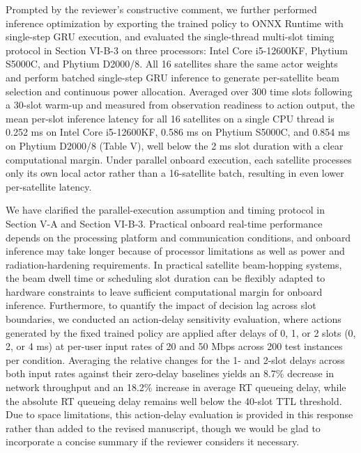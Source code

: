 \documentclass[11pt,a4paper]{article}
\begin{document}
Prompted by the reviewer's constructive comment, we further performed inference optimization by exporting the trained policy to ONNX Runtime with single-step GRU execution, and evaluated the single-thread multi-slot timing protocol in Section VI-B-3 on three processors: Intel Core i5-12600KF, Phytium S5000C, and Phytium D2000/8. All 16 satellites share the same actor weights and perform batched single-step GRU inference to generate per-satellite beam selection and continuous power allocation. Averaged over 300 time slots following a 30-slot warm-up and measured from observation readiness to action output, the mean per-slot inference latency for all 16 satellites on a single CPU thread is 0.252 ms on Intel Core i5-12600KF, 0.586 ms on Phytium S5000C, and 0.854 ms on Phytium D2000/8 (Table V), well below the 2 ms slot duration with a clear computational margin. Under parallel onboard execution, each satellite processes only its own local actor rather than a 16-satellite batch, resulting in even lower per-satellite latency.
\par

We have clarified the parallel-execution assumption and timing protocol in Section V-A and Section VI-B-3. Practical onboard real-time performance depends on the processing platform and communication conditions, and onboard inference may take longer because of processor limitations as well as power and radiation-hardening requirements. In practical satellite beam-hopping systems, the beam dwell time or scheduling slot duration can be flexibly adapted to hardware constraints to leave sufficient computational margin for onboard inference. Furthermore, to quantify the impact of decision lag across slot boundaries, we conducted an action-delay sensitivity evaluation, where actions generated by the fixed trained policy are applied after delays of 0, 1, or 2 slots (0, 2, or 4 ms) at per-user input rates of 20 and 50 Mbps across 200 test instances per condition. Averaging the relative changes for the 1- and 2-slot delays across both input rates against their zero-delay baselines yields an 8.7\% decrease in network throughput and an 18.2\% increase in average RT queueing delay, while the absolute RT queueing delay remains well below the 40-slot TTL threshold. Due to space limitations, this action-delay evaluation is provided in this response rather than added to the revised manuscript, though we would be glad to incorporate a concise summary if the reviewer considers it necessary.
\par
\end{document}

